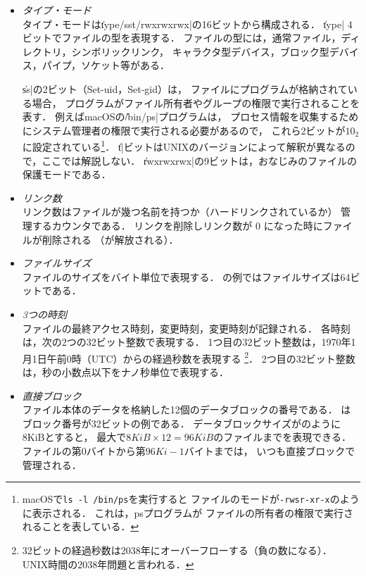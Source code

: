 \begin{itemize}
\item \emph{タイプ・モード}\\
  タイプ・モードは\|type/sst/rwxrwxrwx|の16ビットから構成される．
  \|type| 4ビットでファイルの型を表現する．
  ファイルの型には，通常ファイル，ディレクトリ，シンボリックリンク，
  キャラクタ型デバイス，ブロック型デバイス，パイプ，ソケット等がある．

  \|ss|の2ビット（Set-uid，Set-gid）は，
  ファイルにプログラムが格納されている場合，
  プログラムがファイル所有者やグループの権限で実行されることを表す．
  例えばmacOSの\|/bin/ps|プログラムは，
  プロセス情報を収集するためにシステム管理者の権限で実行される必要があるので，
  これら2ビットが$10_2$に設定されている\footnote{
    macOSで\texttt{ls -l /bin/ps}を実行すると
    ファイルのモードが\texttt{-rwsr-xr-x}のように表示される．
    これは，psプログラムが
    ファイルの所有者の権限で実行されることを表している．}．
  \|t|ビットはUNIXのバージョンによって解釈が異なるので，ここでは解説しない．
  \|rwxrwxrwx|の9ビットは，おなじみのファイルの保護モードである．

\item \emph{リンク数}\\
  リンク数はファイルが幾つ名前を持つか（ハードリンクされているか）
  管理するカウンタである．
  リンクを削除しリンク数が 0 になった時にファイルが削除される
  （\inode が解放される）．

\item \emph{ファイルサイズ}\\
  ファイルのサイズをバイト単位で表現する．
  の例ではファイルサイズは64ビットである．

\item \emph{3つの時刻}\\
  ファイルの最終アクセス時刻，変更時刻，\inode 変更時刻が記録される．
  各時刻は，次の2つの32ビット整数で表現する．
  1つ目の32ビット整数は，1970年1月1日午前0時（UTC）からの経過秒数を表現する
  \footnote{32ビットの経過秒数は2038年にオーバーフローする（負の数になる）．
    UNIX時間の2038年問題と言われる．}．
  2つ目の32ビット整数は，秒の小数点以下をナノ秒単位で表現する．

\item \emph{直接ブロック}\\
  ファイル本体のデータを格納した12個のデータブロックの番号である．
  はブロック番号が32ビットの例である．
  データブロックサイズがのように8KiBとすると，
  最大で$8KiB \times 12 = 96KiB$のファイルまでを表現できる．
  ファイルの第$0$バイトから第$96Ki - 1$バイトまでは，
  いつも直接ブロックで管理される．


\end{itemize}
